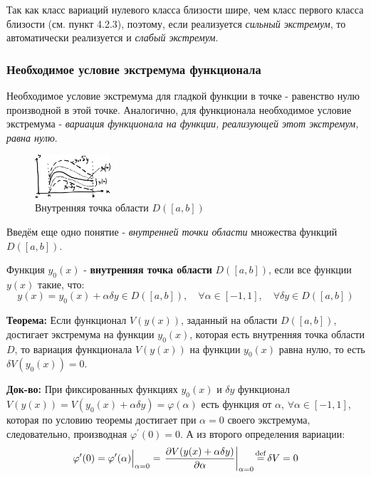 \documentclass[12pt, a4paper]{article}
\newcommand{\defeq}{\stackrel{\mathclap{\mathrm{def}}}{=}}
\begin{document}
Так как класс вариаций нулевого класса близости шире, чем класс первого класса близости (см. пункт 4.2.3), поэтому, если реализуется \textit{сильный экстремум}, то автоматически реализуется и \textit{слабый экстремум}.

\subsubsection{Необходимое условие экстремума функционала}

Необходимое условие экстремума для гладкой функции в точке - равенство нулю производной в этой точке. Аналогично, для функционала необходимое условие экстремума - \textit{вариация функционала на функции, реализующей этот экстремум, равна нулю}.

\begin{figure}
  \centering
  \includegraphics[width=0.25\textwidth]{21}
  \vspace{-4mm}
  \caption{Внутренняя точка области $D([a,b])$}
\end{figure}

Введём еще одно понятие - \textit{внутренней точки области} множества функций $D([a, b])$.

Функция $y_0(x)$ - \textbf{внутренняя точка области} $D([a, b])$, если все функции $y(x)$ такие, что:
\[y(x) = y_0(x) + \alpha \delta y \in D([a, b]), \quad \forall \alpha \in [-1, 1], \quad \forall \delta y \in D([a, b]) \]

\textbf{Теорема:} Если функционал $V(y(x))$, заданный на области $D([a, b])$, достигает экстремума на функции $y_0(x)$, которая есть внутренняя точка области $D$, то вариация функционала $V(y(x))$ на функции $y_0(x)$ равна нулю, то есть $\delta V(y_0(x)) = 0$.

\textbf{Док-во:} При фиксированных функциях $y_0(x)$ и $\delta y$ функционал $V(y(x)) = V(y_0(x) + \alpha \delta y) = \varphi (\alpha)$ есть функция от $\alpha$, $\forall \alpha \in [-1, 1]$, которая по условию теоремы достигает при $\alpha = 0$ своего экстремума, следовательно, производная $\varphi^{\prime}(0) = 0$. А из второго определения вариации:
\[\varphi^{\prime}(0) = \Bigl. \varphi^{\prime}(\alpha) \Bigr|_{\alpha = 0} = \left. \frac{\partial V(y(x) + \alpha \delta y)}{\partial \alpha} \right|_{\alpha = 0} \defeq \delta V = 0 \]
\end{document}

